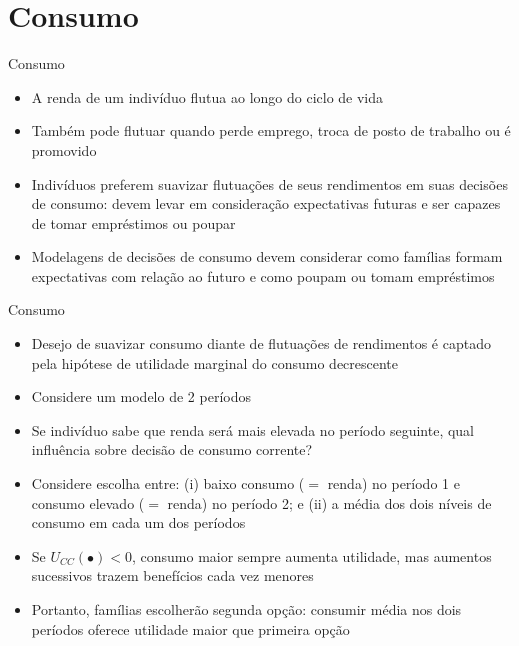 \documentclass[10pt]{beamer}
\begin{document}
\section{Consumo}
\begin{frame}
    {Consumo}
    \begin{itemize}
        \item A renda de um indivíduo flutua ao longo do ciclo de vida\bigskip
        \item Também pode flutuar quando perde emprego, troca de posto de trabalho ou é promovido\bigskip
        \item Indivíduos preferem suavizar flutuações de seus rendimentos em suas decisões de consumo: devem levar em consideração expectativas futuras e ser capazes de tomar empréstimos ou poupar\bigskip
        \item Modelagens de decisões de consumo devem considerar como famílias formam expectativas com relação ao futuro e como poupam ou tomam empréstimos
    \end{itemize}
\end{frame}

\begin{frame}
    {Consumo}
    \begin{itemize}
        \item Desejo de suavizar consumo diante de flutuações de rendimentos é captado pela hipótese de utilidade marginal do consumo decrescente\bigskip
        \item Considere um modelo de 2 períodos\bigskip
        \item Se indivíduo sabe que renda será mais elevada no período seguinte, qual influência sobre decisão de consumo corrente?\bigskip
        \item Considere escolha entre: (i) baixo consumo ($=$ renda) no período 1 e consumo elevado ($=$ renda) no período 2; e (ii) a média dos dois níveis de consumo em cada um dos períodos\bigskip
        \item Se $U_{CC}(\bullet) < 0$, consumo maior sempre aumenta utilidade, mas aumentos sucessivos trazem benefícios cada vez menores\bigskip
        \item Portanto, famílias escolherão segunda opção: consumir média nos dois períodos oferece utilidade maior que primeira opção
    \end{itemize}
\end{frame}
\end{document}
